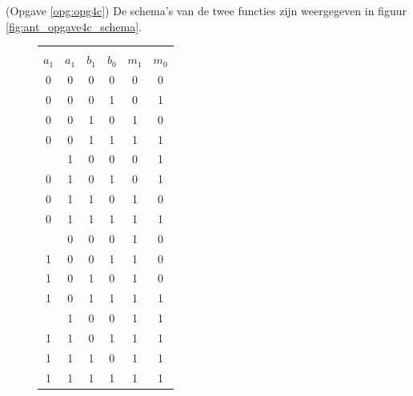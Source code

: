 \documentclass[a4paper,12pt,addpoints,fleqn,dutch]{tisdexam}
\begin{document}
\begin{questions}
(Opgave \ref{opg:opg4c}) De schema's van de twee functies zijn weergegeven
in figuur \ref{fig:ant_opgave4c_schema}.

\begin{figure}[H]
  \begin{minipage}[c]{.30\linewidth}
    \label{tab:ant_opgave4a}
    \begin{tabular}{ c c c c | c  c }
      \hline
              &         &         &         &         &         \\ [-2.9ex]
      $a_{1}$ & $a_{1}$ & $b_{1}$ & $b_{0}$ & $m_{1}$ & $m_{0}$ \\ \hline
         0    &    0    &    0    &    0    &    0    &    0   \\
         0    &    0    &    0    &    1    &    0    &    1   \\
         0    &    0    &    1    &    0    &    1    &    0   \\
         0    &    0    &    1    &    1    &    1    &    1   \\ \hdashline
         0    &    1    &    0    &    0    &    0    &    1   \\
         0    &    1    &    0    &    1    &    0    &    1   \\
         0    &    1    &    1    &    0    &    1    &    0   \\ 
         0    &    1    &    1    &    1    &    1    &    1   \\ \hdashline
         1    &    0    &    0    &    0    &    1    &    0   \\
         1    &    0    &    0    &    1    &    1    &    0   \\
         1    &    0    &    1    &    0    &    1    &    0   \\
         1    &    0    &    1    &    1    &    1    &    1   \\ \hdashline
         1    &    1    &    0    &    0    &    1    &    1   \\
         1    &    1    &    0    &    1    &    1    &    1   \\
         1    &    1    &    1    &    0    &    1    &    1   \\ 
         1    &    1    &    1    &    1    &    1    &    1   \\ \hline
    \end{tabular}
    \vskip10pt
  \end{minipage}\hfill
  \begin{minipage}[c]{0.65\linewidth}

\end{minipage}
\end{figure}
\end{questions}
\end{document}
